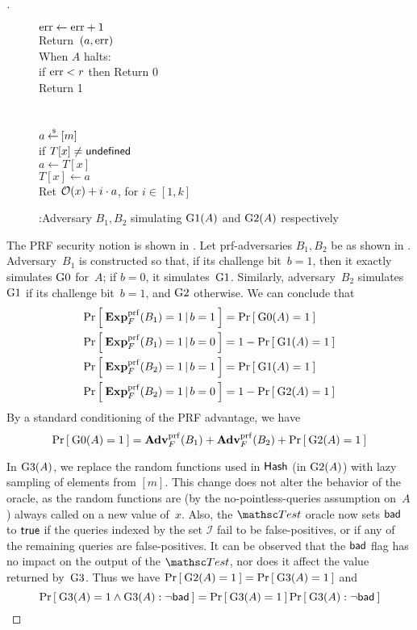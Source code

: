 \begin{proof}[]
\begin{figure}
{{\nudge \nudge $\mathrm{err} \gets\mathrm{err} +1$\\
\nudge Return~$(a,\mathrm{err} )$\\
When $A$ halts: \\
\nudge if $\mathrm{err}  < r$ then Return 0\\
\nudge Return 1\\\\
\\
$a {\:\stackrel{{\scriptscriptstyle \hspace{0.2em}\$}} {\leftarrow}\:} [m]$\\
if $T[x] \neq \mathsf{undefined}$\\
\nudge $a \gets T[x]$\\
$T[x] \gets a$\\
Ret  ${\cal O}(x) + i\cdot a$, for $i\in[1,k]$
}
}
\caption{:Adversary $B_1, B_2$ simulating $\text{G1}(A)$ and $\text{G2}(A)$ respectively}\label{fig:BGame1}
\end{figure}

The PRF security notion is shown in . Let
prf-adversaries $B_1, B_2$ be as shown in .
Adversary~$B_1$ is constructed so that, if its challenge bit~$b=1$,
then it exactly simulates $\text{G0}$ for~$A$; if $b=0$, it
simulates~$\text{G1}$.  Similarly, adversary~$B_2$ simulates~$\text{G1}$
if its challenge bit~$b=1$, and $\text{G2}$ otherwise.  We can conclude
that 
\begin{align*}
\Prob{\ExpPRF{F}{B_1} = 1\,|\,b=1} &= \Prob{\game{0}(A)=1} \\%
\Prob{\ExpPRF{F}{B_1} = 1\,|\,b=0} &= 1-\Prob{\game{1}(A)=1} \\%
\Prob{\ExpPRF{F}{B_2} = 1\,|\,b=1} &= \Prob{\game{1}(A)=1} \\%
\Prob{\ExpPRF{F}{B_2} = 1\,|\,b=0} &= 1-\Prob{\game{2}(A)=1} \\%
\end{align*}
%
\noindent
By a standard conditioning of the PRF advantage, we have 
\begin{equation*}
\Prob{\game{0}(A)=1} = \AdvPRF{F}{B_1} +\AdvPRF{F}{B_2} + \Prob{\game{2}(A)=1}%
\end{equation*}


In $\text{G3}(A)$, we replace the random functions used in
$\mathsf{Hash}$ (in $\text{G2}(A)$) with lazy sampling of elements from
$[m]$.  This change does not alter the behavior of the oracle, as the
random functions are (by the no-pointless-queries assumption on~$A$) always called on a new
value of~$x$.
%
Also, the $\Test$ oracle now sets $\mathsf{bad}$ to $\mathsf{true}$ if the
queries indexed by the set $\mathcal{I}$ fail to be false-positives,
or if any of the remaining queries are false-positives. It can be
observed that the $\mathsf{bad}$ flag has no impact on the output of the
$\Test$, nor does it affect  the value returned
by~$\text{G3}$. Thus we have $\Pr\left[\: \text{G2}(A)=1 \:\right] =
\Pr\left[\: \text{G3}(A)=1 \:\right]$ and
\[
\Prob{\game{3}(A)=1 \wedge \game{3}(A): \neg\bad} = \Prob{\game{3}(A)=1} \Prob{\game{3}(A) : \neg\bad}%
\]


\end{proof}
